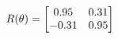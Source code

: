 \documentclass[preview]{standalone}
\begin{document}
\begin{align*}
\special{dvisvgm:raw <g id='unique000'>}R(\theta) = \begin{bmatrix}0.95 & 0.31\\-0.31 & 0.95\end{bmatrix}\special{dvisvgm:raw </g>}
\end{align*}
\end{document}
